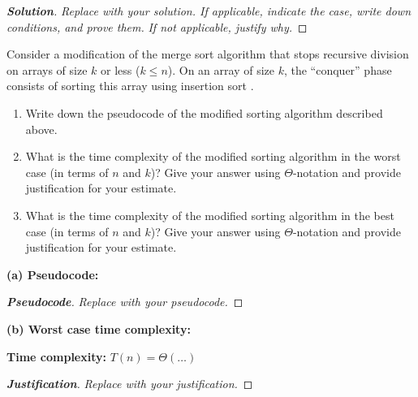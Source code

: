 \documentclass[dvipsnames]{article}
\begin{document}
\begin{problem}
\begin{enumerate}
\begin{mdframed}
    \begin{proof}[\textbf{Solution}]
      \emph{Replace with your solution. If applicable, indicate the case, write down conditions, and prove them.}
      \emph{If not applicable, justify why.}
    \end{proof}
  \end{mdframed}
\end{enumerate}

\end{problem}

\clearpage
\begin{problem}
  Consider a modification of the merge sort algorithm \cite[\S 2.3]{CLRS-2022}
  that stops recursive division on arrays of size $k$ or less ($k \leq n$).
  On an array of size $k$, the ``conquer'' phase consists of sorting this array
  using insertion sort \cite[\S 2.2]{CLRS-2022}.
  
  \begin{enumerate}
    \item Write down the pseudocode of the modified sorting algorithm described above.
    \item What is the time complexity of the modified sorting algorithm in the worst case (in terms of $n$ and $k$)?
      Give your answer using $\Theta$-notation and provide justification for your estimate.
    \item What is the time complexity of the modified sorting algorithm in the best case (in terms of $n$ and $k$)?
      Give your answer using $\Theta$-notation and provide justification for your estimate.
  \end{enumerate}

\color{purple}

\textbf{(a) Pseudocode:}

\begin{proof}[\textbf{Pseudocode}]
  \emph{Replace with your pseudocode.}
\end{proof}

\textbf{(b) Worst case time complexity:}

\begin{mdframed}
  \color{purple}
  \textbf{Time complexity:} $T(n) = \Theta(\ldots)$
  
  \begin{proof}[\textbf{Justification}]
    \emph{Replace with your justification.}
  \end{proof}
\end{mdframed}


\end{problem}
\end{document}
